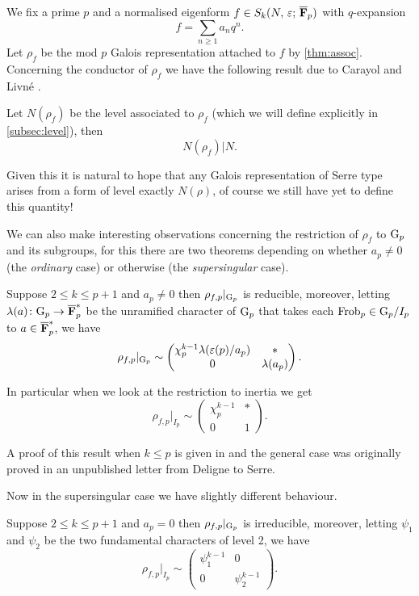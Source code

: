 \documentclass[a4paper,12pt]{article}
\begin{document}
We fix a prime $p$ and a normalised eigenform $f \in S_k(N,\,\varepsilon;\,\overline{\mathbf{F}}_p)$ with $q$-expansion
\[
f = \sum_{n\ge 1} a_nq^n.
\]
Let $\rho_f$ be the mod $p$ Galois representation attached to $f$ by \cref{thm:assoc}.
Concerning the conductor of $\rho_f$ we have the following result due to Carayol and Livn\'e \cite{Carayol, Livne}.

\begin{thm}\label{thm:level}
Let $N(\rho_f)$ be the level associated to $\rho_f$ (which we will define explicitly in \cref{subsec:level}), then
\[
N(\rho_f)|N.
\]
\end{thm}

Given this it is natural to hope that any Galois representation of Serre type arises from a form of level exactly $N(\rho)$, of course we still have yet to define this quantity!

We can also make interesting observations concerning the restriction of $\rho_f$ to $\mathrm{G}_p$ and its subgroups, for this there are two theorems depending on whether $a_p \ne 0$ (the \emph{ordinary} case) or otherwise (the \emph{supersingular} case).

\begin{thm}[Deligne]\label{thm:ordinary}
Suppose $2\le k\le p+1$ and $a_p \ne 0$ then $\rho_{f,p}|_{\mathrm{G}_p}$ is reducible, moreover, letting $\lambda(a)\colon \mathrm{G}_p \to \overline{\mathbf{F}}_p^*$ be the unramified character of $\mathrm{G}_p$ that takes each $\operatorname{Frob}_p \in \mathrm{G}_p /I_p$ to $a\in\overline{\mathbf{F}}_p^*$, we have
\[
\rho_{f,p}|_{\mathrm{G}_p} \sim \begin{pmatrix} \chi_p^{k-1}\lambda(\varepsilon(p)/a_p) & * \\ 0 & \lambda(a_p)\end{pmatrix}.
\]

In particular when we look at the restriction to inertia we get
\[
\rho_{f,p}|_{I_{p}} \sim \begin{pmatrix} \chi_p^{k-1} & * \\ 0 & 1\end{pmatrix}.
\]
\end{thm}

A proof of this result when $k \le p$ is given in \cite{Gross} and the general case was originally proved in an unpublished letter from Deligne to Serre.

Now in the supersingular case we have slightly different behaviour.

\begin{thm}[Fontaine]\label{thm:super}
Suppose $2\le k \le p +1$ and $a_p = 0$ then $\rho_{f,p}|_{\mathrm{G}_p}$ is irreducible, moreover, letting $\psi_1$ and $\psi_2$ be the two fundamental characters of level 2, we have
\[
\rho_{f,p}|_{I_p} \sim \begin{pmatrix} \psi_1^{k-1} & 0 \\ 0 & \psi_2^{k-1}\end{pmatrix}.
\]
\end{thm}
\end{document}
